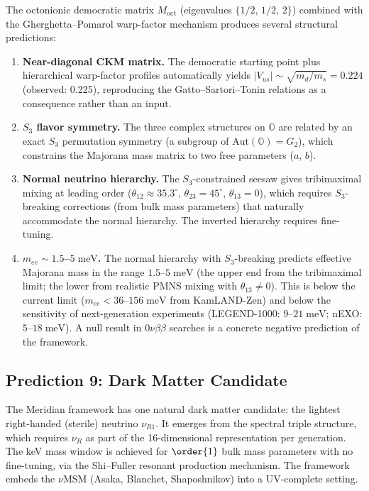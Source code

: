 The octonionic democratic matrix $M_\mathrm{oct}$ (eigenvalues $\{1/2,\, 1/2,\, 2\}$) combined with the Gherghetta--Pomarol warp-factor mechanism produces several structural predictions:
\begin{enumerate}
\item \textbf{Near-diagonal CKM matrix.} The democratic starting point plus hierarchical warp-factor profiles automatically yields $|V_{us}| \sim \sqrt{m_d/m_s} = 0.224$ (observed: 0.225), reproducing the Gatto--Sartori--Tonin relations as a consequence rather than an input.
\item \textbf{$S_3$ flavor symmetry.} The three complex structures on $\mathbb{O}$ are related by an exact $S_3$ permutation symmetry (a subgroup of $\mathrm{Aut}(\mathbb{O}) = G_2$), which constrains the Majorana mass matrix to two free parameters ($a$, $b$).
\item \textbf{Normal neutrino hierarchy.} The $S_3$-constrained seesaw gives tribimaximal mixing at leading order ($\theta_{12} \approx 35.3^\circ$, $\theta_{23} = 45^\circ$, $\theta_{13} = 0$), which requires $S_3$-breaking corrections (from bulk mass parameters) that naturally accommodate the normal hierarchy. The inverted hierarchy requires fine-tuning.
\item \textbf{$m_{ee} \sim 1.5$--$5\;\mathrm{meV}$.} The normal hierarchy with $S_3$-breaking predicts effective Majorana mass in the range $1.5$--$5\;\mathrm{meV}$ (the upper end from the tribimaximal limit; the lower from realistic PMNS mixing with $\theta_{13} \neq 0$). This is below the current limit ($m_{ee} < 36$--$156\;\mathrm{meV}$ from KamLAND-Zen) and below the sensitivity of next-generation experiments (LEGEND-1000: $9$--$21\;\mathrm{meV}$; nEXO: $5$--$18\;\mathrm{meV}$). A null result in $0\nu\beta\beta$ searches is a concrete negative prediction of the framework.
\end{enumerate}

\subsection{Prediction 9: Dark Matter Candidate}
\label{sec:1-pred9}

The Meridian framework has one natural dark matter candidate: the lightest right-handed (sterile) neutrino $\nu_{R1}$. It emerges from the spectral triple structure, which requires $\nu_R$ as part of the 16-dimensional representation per generation. The keV mass window is achieved for $\order{1}$ bulk mass parameters with no fine-tuning, via the Shi--Fuller resonant production mechanism. The framework embeds the $\nu$MSM (Asaka, Blanchet, Shaposhnikov) into a UV-complete setting.

